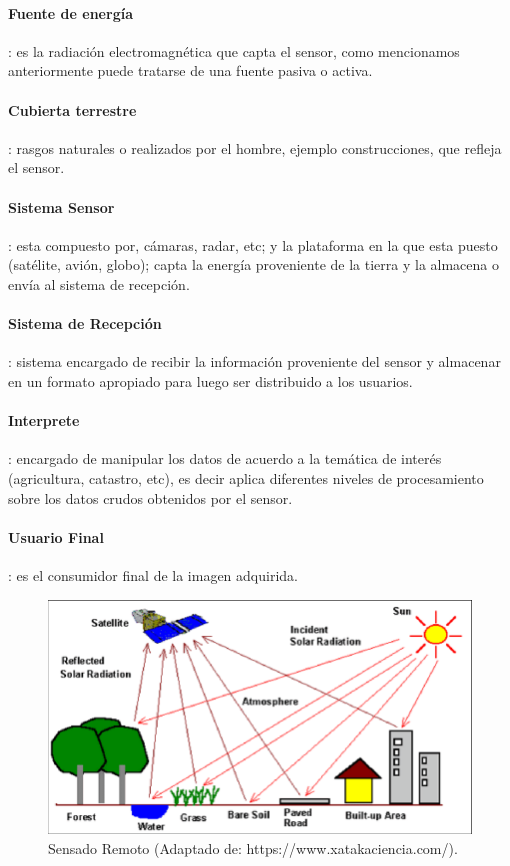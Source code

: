 \paragraph{Fuente de energía}: es la radiación electromagnética que capta el sensor, como mencionamos anteriormente puede tratarse de una fuente pasiva o activa.
\paragraph{Cubierta terrestre}: rasgos naturales o realizados por el hombre, ejemplo construcciones, que refleja el sensor.
\paragraph{Sistema Sensor}: esta compuesto por, cámaras, radar, etc; y la plataforma en la que esta puesto (satélite, avión, globo);  capta la energía proveniente de la tierra y la almacena o envía al sistema de recepción.
\paragraph{Sistema de Recepción}: sistema encargado de recibir la información proveniente del sensor y almacenar en un formato apropiado para luego ser distribuido a los usuarios.
\paragraph{Interprete}: encargado de manipular los datos de acuerdo a la temática de interés (agricultura, catastro, etc), es decir aplica diferentes niveles de procesamiento sobre los datos crudos obtenidos por el sensor.
\paragraph{Usuario Final}: es el consumidor final de la imagen adquirida.

\begin{figure}[H] \centering
  \includegraphics[scale=0.4, keepaspectratio=true,clip=true]{imagenes/MarcoTeorico/teledeteccion.png}
  \caption{Sensado Remoto (Adaptado de: https://www.xatakaciencia.com/).}\label{Fig:teledeteccion}
\end{figure}

